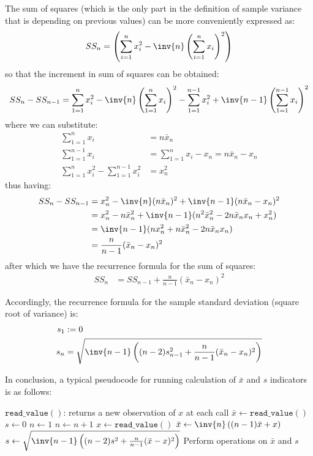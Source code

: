 \documentclass{article}
\begin{document}
The sum of squares (which is the only part in the definition of sample variance that is depending on previous values) can be more conveniently expressed as:
\begin{align}
  SS_n = \left(\sum_{i=1}^{n}x_i^2 - \inv{n}\left(\sum_{i=1}^{n} x_i\right)^2\right)
\end{align}
so that the increment in sum of squares can be obtained:
\begin{multline}
  SS_n - SS_{n-1} = \sum_{1=1}^n x_i^2 - \inv{n}\left(\sum_{1=1}^n x_i\right)^2 - \sum_{1=1}^{n-1} x_i^2 + \inv{n-1}\left(\sum_{1=1}^{n-1} x_i\right)^2
\end{multline}
where we can substitute:
\begin{align}
  \sum_{1=1}^n x_i &= n \bar x_n \\
  \sum_{1=1}^{n-1} x_i &= \sum_{1=1}^n x_i - x_n = n \bar x_n - x_n \\
  \sum_{1=1}^{n} x_i^2 - \sum_{1=1}^{n-1} x_i^2 &= x_n^2
\end{align}
thus having:
\begin{align}
  SS_n - SS_{n-1} &= x_n^2 - \inv{n}(n \bar x_n)^2 + \inv{n-1}(n \bar x_n -x_n)^2 \\
  &= x_n^2 - n\bar x_n^2 + \inv{n-1}(n^2 \bar x_n^2 - 2n \bar x_n x_n + x_n^2) \\
  &= \inv{n-1}(n x_n^2 + n \bar x_n^2 - 2 n \bar x_n x_n) \\
  &= \frac{n}{n-1}(\bar x_n - x_n)^2
\end{align}
after which we have the recurrence formula for the sum of squares:
\begin{align}
  SS_n &= SS_{n-1} + \frac{n}{n-1}(\bar x_n - x_n)^2
\end{align}

Accordingly, the recurrence formula for the sample standard deviation (square root of variance) is:
\begin{align}
  s_1 &:= 0 \\
  s_n &= \sqrt{\inv{n-1} \left( (n-2) s_{n-1}^2 + \frac{n}{n-1}(\bar x_n - x_n)^2 \right)} \label{eq:recursd}
\end{align}

In conclusion, a typical pseudocode for running calculation of $\bar x$ and $s$ indicators is as follows:

\begin{algorithmic}[1]
  \Require $\mathtt{read\_value}()$: returns a new observation of $x$ at each call
  \State $\bar x \gets \mathtt{read\_value}()$ 
  \State $s \gets 0$
  \State $n \gets 1$
  \Repeat {}
    \State $n \gets n+1$
    \State $x \gets \mathtt{read\_value}()$
    \State $\bar x \gets \inv{n}\left((n-1) \bar x + x\right)$ 
    \State $s \gets \sqrt{\inv{n-1} \left( (n-2) s^2 + \frac{n}{n-1}(\bar x - x)^2\right)}$ 
    \State Perform operations on $\bar x$ and $s$
\end{algorithmic}

\end{document}
